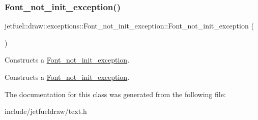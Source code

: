 \subsubsection{\texorpdfstring{Font\+\_\+not\+\_\+init\+\_\+exception()}{Font\_not\_init\_exception()}}
{\footnotesize\ttfamily jetfuel\+::draw\+::exceptions\+::\+Font\+\_\+not\+\_\+init\+\_\+exception\+::\+Font\+\_\+not\+\_\+init\+\_\+exception (\begin{DoxyParamCaption}{ }\end{DoxyParamCaption})\hspace{0.3cm}{\ttfamily [inline]}}



Constructs a \hyperlink{classjetfuel_1_1draw_1_1exceptions_1_1Font__not__init__exception}{Font\+\_\+not\+\_\+init\+\_\+exception}. 

Constructs a \hyperlink{classjetfuel_1_1draw_1_1exceptions_1_1Font__not__init__exception}{Font\+\_\+not\+\_\+init\+\_\+exception}. 

The documentation for this class was generated from the following file\+:\begin{DoxyCompactItemize}
\item 
include/jetfueldraw/text.\+h\end{DoxyCompactItemize}
